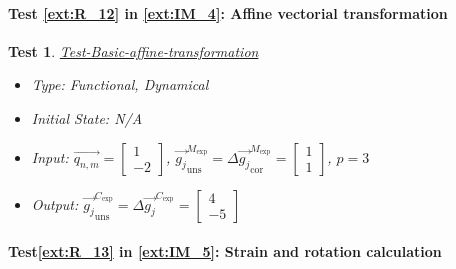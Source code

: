 \documentclass[12pt, titlepage]{article}
\newtheorem{Test}{Test}
\begin{document}
\paragraph{Test \cref{ext:R_12} in \cref{ext:IM_4}: Affine vectorial transformation}

\begin{Test}\normalfont\underline{Test-Basic-affine-transformation}
\label{Test-Basic-affine-transformation}
\begin{itemize}
\item Type: Functional, Dynamical
\item Initial State: N/A
\item Input: $\overrightarrow{q_{n,m}}=\begin{bmatrix}
1 \\
-2
\end{bmatrix}$, $\overrightarrow{g_{j}}_{\text{uns}}^{M_{\text{exp}}}=\Delta\overrightarrow{g_{j}}_{\text{cor}}^{M_{\text{exp}}}=\begin{bmatrix}
1 \\
1
\end{bmatrix}$, $p=3$
\item Output:  $\overrightarrow{g_{j}}_{\text{uns}}^{C_{\text{exp}}}=\Delta\overrightarrow{g_{j}}^{C_{\text{exp}}}=\begin{bmatrix}
4\\
-5
\end{bmatrix}$
\end{itemize}
\end{Test}

\paragraph{Test\cref{ext:R_13} in \cref{ext:IM_5}: Strain and rotation calculation}						
\end{document}
